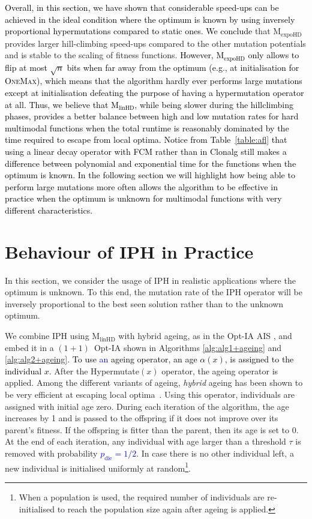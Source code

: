\documentclass[lettersize,journal]{IEEEtran}
\newcommand{\new}[1]{\textcolor{black}{#1}}
\newcommand{\rev}[1]{\textcolor{blue}{#1}}
\newcommand{\linHD}{M$_{\text{linHD}}$}
\newcommand{\expoHD}{M$_{\text{expoHD}}$}
\newcommand{\IPHfcm}{IPH}
\begin{document}
 \new{Overall, in this section, we have shown that considerable speed-ups can be achieved in the ideal condition where the optimum is known by using inversely proportional hypermutations compared to static ones.
We conclude} that {\expoHD } provides larger hill-climbing speed-ups compared to the other mutation potentials and is stable to the scaling of fitness functions.
\new{However, {\expoHD } only allows to flip at most $\sqrt{n}$ bits when far away from the optimum (e.g., at initialisation for \textsc{OneMax}), which means that the algorithm hardly ever performs large mutations except at initialisation defeating the purpose of having a hypermutation operator at all. Thus, we believe that \linHD, while being slower during the hillclimbing phases, provides a better balance between high and low mutation rates for hard multimodal functions when the total runtime is reasonably dominated by the time required to escape from local optima. Notice from Table~\ref{table:afl} that using a linear decay operator with FCM  rather than in Clonalg still makes a difference between polynomial and exponential time for the functions when the optimum is known. In the following section we will highlight how being able to perform large mutations more often allows the algorithm to be effective in practice when the optimum is unknown for multimodal functions with very different characteristics.}

 	
 	\section{Behaviour of IPH in Practice}

In this section, we consider the usage of IPH in realistic applications where the optimum is unknown.
 To this end, the mutation rate of the IPH operator will be inversely proportional to the best seen solution rather than to the unknown optimum. 
 
 We combine \IPHfcm{} using {\linHD } with hybrid ageing, as in the Opt-IA AIS \cite{CutelloNicosiaPavoneTimmis2007}, and embed it in a $(1+1)$~Opt-IA shown in Algorithms \ref{alg:alg1+ageing} and \ref{alg:alg2+ageing}. \new{To use \rev{an} ageing operator, an age $\alpha(x)$, is assigned to the individual $x$.} After the Hypermutate$(x)$ operator, the ageing operator is applied.
 	Among the different variants of ageing, {\it hybrid} ageing has been shown to be very efficient at escaping local optima~\cite{OlivetoSudholt2014ageing,CorusOlivetoYazdani2019TCS,CorusOlivetoYazdaniFASTAIS2018,CorusOlivetoYazdaniPPSN2018Approx}. Using this operator,  individuals are assigned with initial age zero. During each iteration of the algorithm, the age  increases by 1 and is passed to the offspring if it does not improve over its parent's fitness. If the offspring is fitter than the parent, then its age is set to 0. At the end of each iteration, any individual with age larger than a threshold $\tau$ is removed with probability \rev{$p_{\text{die}}=1/2$}. In case there is no other individual left, a new individual is initialised uniformly at random\footnote{When a population is used, the required number of individuals are re-initialised to reach the population size again after ageing is applied.}. 
 
\end{document}
